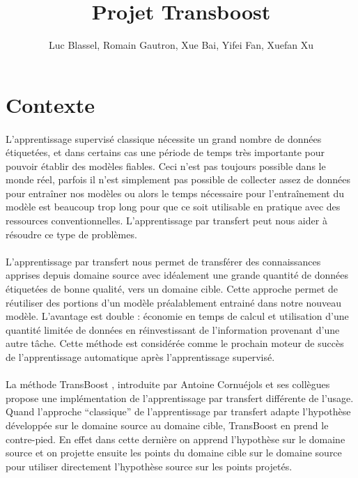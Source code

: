 \documentclass[11 pt]{article}
\title{Projet Transboost}
\author{Luc Blassel, Romain Gautron, Xue Bai, Yifei Fan, Xuefan Xu}
\begin{document}
\maketitle

\tableofcontents
\newpage

\section{Contexte}
\paragraph{}L’apprentissage supervisé  classique nécessite un grand nombre de données étiquetées, et dans certains cas une période de temps très importante pour pouvoir établir des modèles fiables. Ceci n’est pas toujours possible dans le monde réel, parfois il n’est simplement pas possible de collecter assez de données pour entraîner nos modèles ou alors le temps nécessaire pour l'entraînement du modèle est beaucoup trop long pour que ce soit utilisable en pratique avec des ressources conventionnelles. L’apprentissage par transfert peut nous aider à résoudre ce type de problèmes.

\paragraph{}L’apprentissage par transfert nous permet de transférer des connaissances apprises depuis domaine source avec idéalement une grande quantité de données étiquetées de bonne qualité, vers un domaine cible. Cette approche permet de réutiliser des portions d’un modèle préalablement entrainé dans notre nouveau modèle. L'avantage est double : économie en temps de calcul et utilisation d'une quantité limitée de données en réinvestissant de l'information provenant d'une autre tâche. Cette méthode est considérée comme le prochain moteur de succès de l’apprentissage automatique après l’apprentissage supervisé.

\paragraph{}La méthode TransBoost \cite{transboost}, introduite par Antoine Cornuéjols et ses collègues propose une implémentation de l’apprentissage par transfert différente de l'usage. Quand l’approche “classique” de l’apprentissage par transfert adapte l'hypothèse développée sur le domaine source au domaine cible, TransBoost en prend le contre-pied. En effet dans cette dernière on apprend l'hypothèse sur le domaine source et on projette ensuite les points du domaine cible sur le domaine source pour utiliser directement l'hypothèse source sur les points projetés.
\end{document}
